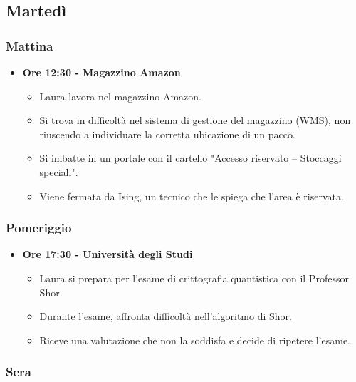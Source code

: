 \subsection*{Martedì}

\subsubsection*{Mattina}

\begin{itemize}
    \item \textbf{Ore 12:30 - Magazzino Amazon}
    \begin{itemize}
        \item Laura lavora nel magazzino Amazon.
        \item Si trova in difficoltà nel sistema di gestione del magazzino (WMS), non riuscendo a individuare la corretta ubicazione di un pacco.
        \item Si imbatte in un portale con il cartello "Accesso riservato – Stoccaggi speciali".
        \item Viene fermata da Ising, un tecnico che le spiega che l'area è riservata.
    \end{itemize}
\end{itemize}

\subsubsection*{Pomeriggio}

\begin{itemize}
    \item \textbf{Ore 17:30 - Università degli Studi}
    \begin{itemize}
        \item Laura si prepara per l'esame di crittografia quantistica con il Professor Shor.
        \item Durante l'esame, affronta difficoltà nell'algoritmo di Shor.
        \item Riceve una valutazione che non la soddisfa e decide di ripetere l'esame.
    \end{itemize}
\end{itemize}

\subsubsection*{Sera}

